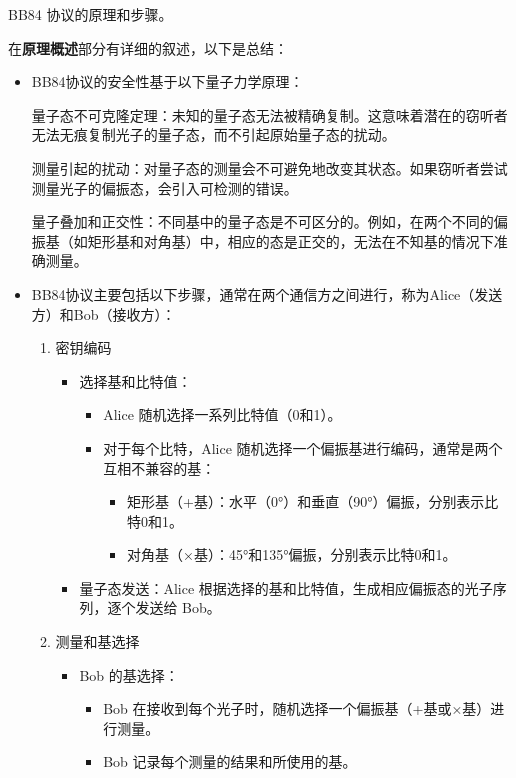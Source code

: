 \begin{question}
	BB84 协议的原理和步骤。
\end{question}
在\textbf{原理概述}部分有详细的叙述，以下是总结：
\begin{itemize}
	\item BB84协议的安全性基于以下量子力学原理：
	
	量子态不可克隆定理：未知的量子态无法被精确复制。这意味着潜在的窃听者无法无痕复制光子的量子态，而不引起原始量子态的扰动。
	
	测量引起的扰动：对量子态的测量会不可避免地改变其状态。如果窃听者尝试测量光子的偏振态，会引入可检测的错误。
	
	量子叠加和正交性：不同基中的量子态是不可区分的。例如，在两个不同的偏振基（如矩形基和对角基）中，相应的态是正交的，无法在不知基的情况下准确测量。
	
	\item BB84协议主要包括以下步骤，通常在两个通信方之间进行，称为Alice（发送方）和Bob（接收方）：
	\begin{enumerate}
		\item 密钥编码
		
		\begin{itemize}
			\item 选择基和比特值：
			\begin{itemize}
				\item Alice 随机选择一系列比特值（0和1）。
				\item 对于每个比特，Alice 随机选择一个偏振基进行编码，通常是两个互相不兼容的基：
				\begin{itemize}
					\item 矩形基（+基）：水平（0°）和垂直（90°）偏振，分别表示比特0和1。
					\item 对角基（×基）：45°和135°偏振，分别表示比特0和1。
				\end{itemize}
			\end{itemize}
			
			\item 量子态发送：Alice 根据选择的基和比特值，生成相应偏振态的光子序列，逐个发送给 Bob。
		\end{itemize}
		
		\item 测量和基选择
		
		\begin{itemize}
			\item Bob 的基选择：
			\begin{itemize}
				\item Bob 在接收到每个光子时，随机选择一个偏振基（+基或×基）进行测量。
				\item Bob 记录每个测量的结果和所使用的基。
			\end{itemize}
		\end{itemize}
		

\end{enumerate}
\end{itemize}
